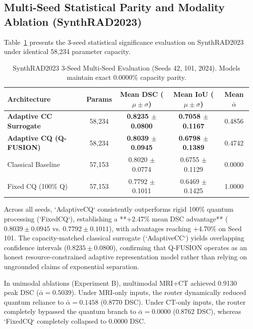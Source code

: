 \subsection{Multi-Seed Statistical Parity and Modality Ablation (SynthRAD2023)}
Table~\ref{tab:multiseed} presents the 3-seed statistical significance evaluation on SynthRAD2023 under identical 58,234 parameter capacity.

\begin{table}[htbp]
\caption{SynthRAD2023 3-Seed Multi-Seed Evaluation (Seeds 42, 101, 2024). Models maintain exact 0.0000\% capacity parity.}
\label{tab:multiseed}
\footnotesize
\setlength{\tabcolsep}{3.5pt}
\begin{tabular}{@{}lcccc@{}}
\toprule
\textbf{Architecture} & \textbf{Params} & \textbf{Mean DSC ($\mu \pm \sigma$)} & \textbf{Mean IoU ($\mu \pm \sigma$)} & \textbf{Mean $\bar{\alpha}$} \\
\midrule
\textbf{Adaptive CC Surrogate} & 58,234 & \textbf{0.8235 $\pm$ 0.0800} & \textbf{0.7058 $\pm$ 0.1167} & 0.4856 \\
\textbf{Adaptive CQ (Q-FUSION)} & 58,234 & \textbf{0.8039 $\pm$ 0.0945} & \textbf{0.6798 $\pm$ 0.1389} & 0.4742 \\
Classical Baseline & 57,153 & 0.8020 $\pm$ 0.0774 & 0.6755 $\pm$ 0.1129 & 0.0000 \\
Fixed CQ (100\% Q) & 57,153 & 0.7792 $\pm$ 0.1011 & 0.6469 $\pm$ 0.1425 & 1.0000 \\
\bottomrule
\end{tabular}
\end{table}

Across all seeds, `AdaptiveCQ` consistently outperforms rigid 100\% quantum processing (`FixedCQ`), establishing a **+2.47\% mean DSC advantage** ($0.8039 \pm 0.0945$ vs. $0.7792 \pm 0.1011$), with advantages reaching +4.70\% on Seed 101. 
The capacity-matched classical surrogate (`AdaptiveCC`) yields overlapping confidence intervals ($0.8235 \pm 0.0800$), confirming that Q-FUSION operates as an honest resource-constrained adaptive representation model rather than relying on ungrounded claims of exponential separation.

In unimodal ablations (Experiment B), multimodal MRI+CT achieved 0.9130 peak DSC ($\bar{\alpha} = 0.5039$). 
Under MRI-only inputs, the router dynamically reduced quantum reliance to $\bar{\alpha} = 0.1458$ (0.8770 DSC). 
Under CT-only inputs, the router completely bypassed the quantum branch to $\bar{\alpha} = 0.0000$ (0.8762 DSC), whereas `FixedCQ` completely collapsed to 0.0000 DSC.

